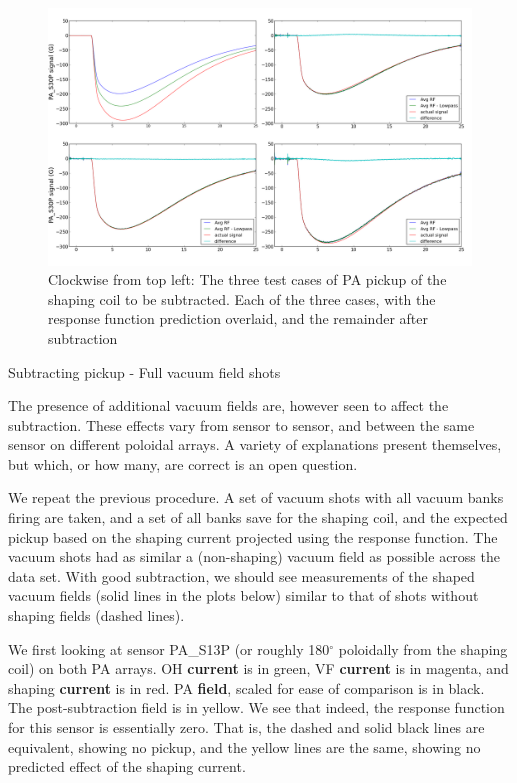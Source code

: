 \documentclass{article}
\begin{document}
\par
\begin{figure}[h!]
\includegraphics[width = \textwidth]{./sh_only_vac_subtract.png}\caption{Clockwise from top left: The three test cases of PA pickup of the shaping coil to be subtracted.  Each of the three cases, with the response function prediction overlaid, and the remainder after subtraction}
\label{raw_sig}
\end{figure}
\begin{center}
\begin{LARGE}
Subtracting pickup - Full vacuum field shots
\end{LARGE}
\end{center}
\par
The presence of additional vacuum fields are, however seen to affect the subtraction.  These effects vary from sensor to sensor, and between the same sensor on different poloidal arrays.  A variety of explanations present themselves, but which, or how many, are correct is an open question.
\par
We repeat the previous procedure.  A set of vacuum shots with all vacuum banks firing are taken, and a set of all banks save for the shaping coil, and the expected pickup based on the shaping current projected using the response function.  The vacuum shots had as similar a (non-shaping) vacuum field as possible across the data set.  With good subtraction, we should see measurements of the shaped vacuum fields (solid lines in the plots below) similar to that of shots without shaping fields (dashed lines).
\par 
We first looking at sensor PA\_S13P (or roughly 180$^{\circ}$ poloidally from the shaping coil) on both PA arrays.  OH \textbf{current} is in green, VF \textbf{current} is in magenta, and shaping \textbf{current} is in red.  PA \textbf{field}, scaled for ease of comparison is in black.  The post-subtraction field is in yellow.  We see that indeed, the response function for this sensor is essentially zero.  That is, the dashed and solid black lines are equivalent, showing no pickup, and the yellow lines are the same, showing no predicted effect of the shaping current.
\end{document}
